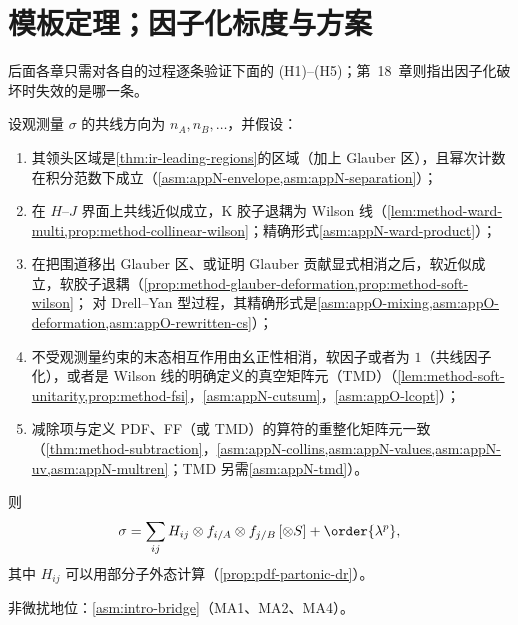 \section{模板定理；因子化标度与方案}\label{sec:method-template}

后面各章只需对各自的过程逐条验证下面的 (H1)--(H5)；第~18~章则指出因子化破坏时失效的是哪一条。

\begin{theorem}\label{thm:method-template}
设观测量 $\sigma$ 的共线方向为 $n_A,n_B,\ldots$，并假设：
\begin{enumerate}[label=\textbf{(H\arabic*)},leftmargin=3.2em,itemsep=1pt,topsep=2pt]
\item 其领头区域是\cref{thm:ir-leading-regions}的区域（加上 Glauber 区），且幂次计数在积分范数下成立（\cref{asm:appN-envelope,asm:appN-separation}）；
\item 在 $H$--$J$ 界面上共线近似成立，K 胶子退耦为 Wilson 线（\cref{lem:method-ward-multi,prop:method-collinear-wilson}；精确形式\cref{asm:appN-ward-product}）；
\item 在把围道移出 Glauber 区、或证明 Glauber 贡献显式相消之后，软近似成立，软胶子退耦（\cref{prop:method-glauber-deformation,prop:method-soft-wilson}；
  对 Drell--Yan 型过程，其精确形式是\cref{asm:appO-mixing,asm:appO-deformation,asm:appO-rewritten-cs}）；
\item 不受观测量约束的末态相互作用由幺正性相消，软因子或者为 $1$（共线因子化），或者是 Wilson 线的明确定义的真空矩阵元（TMD）（\cref{lem:method-soft-unitarity,prop:method-fsi}，\cref{asm:appN-cutsum}，\cref{asm:appO-lcopt}）；
\item 减除项与定义 PDF、FF（或 TMD）的算符的重整化矩阵元一致（\cref{thm:method-subtraction}，\cref{asm:appN-collins,asm:appN-values,asm:appN-uv,asm:appN-multren}；TMD 另需\cref{asm:appN-tmd}）。
\end{enumerate}
则
\begin{equation}\label{eq:method-template}
\sigma=\sum_{ij}H_{ij}\otimes f_{i/A}\otimes f_{j/B}\,[\otimes S]+\order{\lambda^p} ,
\end{equation}
其中 $H_{ij}$ 可以用部分子外态计算（\cref{prop:pdf-partonic-dr}）。

非微扰地位：\cref{asm:intro-bridge}（MA1、MA2、MA4）。
\end{theorem}

